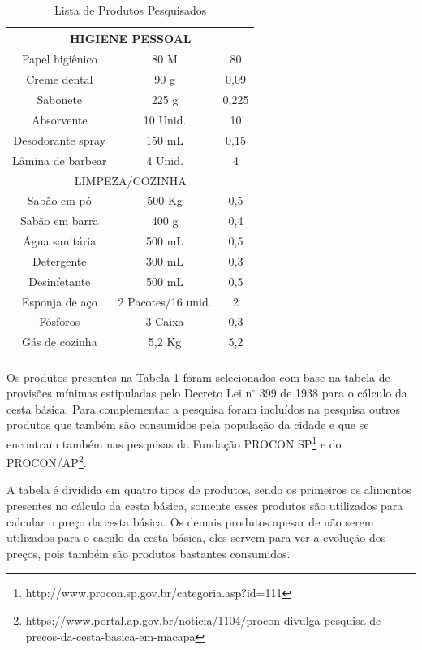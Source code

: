 \documentclass{ifto-tex}
\begin{document}
\begin{longtable}{|c|c|c|}
	\hline
	\multicolumn{3}{|c|}{HIGIENE PESSOAL}                      \\
	\hline
	Papel higiênico   & 80 M               & 80           \\
	\hline
	Creme dental      & 90 g               & 0,09            \\
	\hline
	Sabonete          & 225 g              & 0,225           \\
	\hline
	Absorvente        & 10 Unid.           & 10             \\
	\hline
	Desodorante spray & 150 mL             & 0,15            \\
	\hline
	Lâmina de barbear & 4 Unid.            & 4               \\
	\hline
	\multicolumn{3}{|c|}{LIMPEZA/COZINHA}                      \\
	\hline
	Sabão em pó       & 500 Kg             & 0,5             \\
	\hline
	Sabão em barra    & 400 g              & 0,4             \\
	\hline
	Água sanitária    & 500 mL             & 0,5             \\
	\hline
	Detergente        & 300 mL             & 0,3             \\
	\hline
	Desinfetante      & 500 mL             & 0,5             \\
	\hline
	Esponja de aço    & 2 Pacotes/16 unid. & 2               \\
	\hline
	Fósforos          & 3 Caixa            & 0,3             \\
	\hline
	Gás de cozinha    & 5,2 Kg             & 5,2       \\
	\hline     
	\caption{Lista de Produtos Pesquisados}
\end{longtable}

Os produtos presentes na Tabela 1 foram selecionados com base na tabela de provisões mínimas estipuladas pelo Decreto Lei n$^{\circ}$ 399 de 1938 para o cálculo da cesta básica. Para complementar a pesquisa foram incluídos na pesquisa outros produtos que também são consumidos pela população da cidade e que se encontram também nas pesquisas da Fundação PROCON SP\footnote{http://www.procon.sp.gov.br/categoria.asp?id=111} e do PROCON/AP\footnote{https://www.portal.ap.gov.br/noticia/1104/procon-divulga-pesquisa-de-precos-da-cesta-basica-em-macapa}.

A tabela é dividida em quatro tipos de produtos, sendo os primeiros os alimentos presentes no cálculo da cesta básica, somente esses produtos são utilizados para calcular o preço da cesta básica. Os demais produtos apesar de não serem utilizados para o caculo da cesta básica, eles servem para ver a evolução dos preços, pois também são produtos bastantes consumidos.
\end{document}
